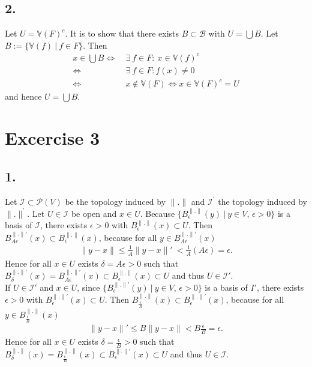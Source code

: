 \documentclass{article}
\begin{document}
\subsection*{2.}
Let $U = \mathbb{V}(F)^{c}$. It is to show that there exists $B \subset \mathcal{B}$ with $U = \bigcup B$.
Let $B := \{ \mathbb{V}(f) \ | \ f \in F\}$.
Then
\begin{align*}
  x \in \bigcup B
  \Leftrightarrow \ & \exists \ f \in F : \ x \in \mathbb{V}(f)^{c} \\
  \Leftrightarrow \ & \exists \ f \in F : f(x) \neq 0 \\
  \Leftrightarrow \ & x \notin \mathbb{V}(F) \Leftrightarrow x \in \mathbb{V}(F)^{c} = U
\end{align*}
and hence $U = \bigcup B$.

\section*{Excercise 3}
\label{sec:Ex3}

\subsection*{1.}
Let $\mathcal{I} \subset \mathcal{P}(V)$ be the topology induced by $\| . \|$ and $\mathcal{I}^{\prime}$ the topology induced by $\|.\|^{\prime}$.
Let $U \in \mathcal{I}$ be open and $x \in U$.
Because $\{B_{\epsilon}^{\|.\|}(y) \ | \ y \in V ,\, \epsilon > 0\}$ is a basis of $\mathcal{I}$, there exists $\epsilon > 0$ with $B_{\epsilon}^{\|.\|}(x) \subset U$.
Then $B_{A \epsilon}^{\|.\|'}(x) \subset B_{\epsilon}^{\|.\|}(x)$, because for all $y \in B_{A \epsilon}^{\| . \|'}(x)$
\begin{align*}
  \|y-x\| \leq \frac{1}{A} \| y - x \|' \ < \frac{1}{A} (A \epsilon) = \epsilon.
\end{align*}
Hence for all $x \in U$ exists $\delta = A \epsilon > 0$ such that $B_{\delta}^{\|.\|'}(x) = B_{A \epsilon}^{\|.\|'}(x) \subset B_{\epsilon}^{\|.\|}(x) \subset U$ and thus $U \in \mathcal{I}'$.\\
If $U \in \mathcal{I}'$ and $x \in U$, since $\{ B_{\epsilon}^{\|.\|'}(y) \ | \ y \in V ,\, \epsilon > 0\}$ is a basis of $I'$, there exists $\epsilon > 0$ with $B_{\epsilon}^{\|.\|'}(x) \subset U$.
Then $B_{\frac{\epsilon}{B}}^{\|.\|}(x) \subset B_{\epsilon}^{\|.\|'}(x)$, because for all $y \in B_{\frac{\epsilon}{B}}^{\|.\|}(x)$
\begin{align*}
  \| y - x \| ' \leq B \| y - x \| < B \frac{\epsilon}{B} = \epsilon.
\end{align*}
Hence for all $x \in U$ exists $\delta = \frac{\epsilon}{B} > 0$ such that $B_{\delta}^{\|.\|}(x) = B_{\frac{\epsilon}{B}}^{\|.\|}(x) \subset B_{\epsilon}^{\| . \|'}(x) \subset U$ and thus $U \in \mathcal{I}$.
\end{document}
